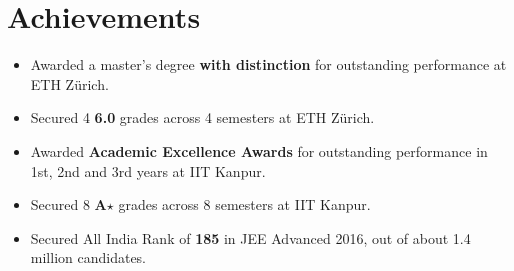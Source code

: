 %

\section*{Achievements}
\begin{itemize}[leftmargin=*,itemsep=0mm,label={\footnotesize\textbullet}]

\item Awarded a master's degree \textbf{with distinction} for outstanding performance at ETH Zürich.
\item Secured 4 \textbf{6.0} grades across 4 semesters at ETH Zürich.
\item Awarded \textbf{Academic Excellence Awards} for outstanding performance in 1st, 2nd and 3rd years at IIT Kanpur.
\item Secured 8 \textbf{A$\star$} grades across 8 semesters at IIT Kanpur.
\item Secured All India Rank of \textbf{185} in JEE Advanced 2016, out of about 1.4 million candidates.

\end{itemize}
